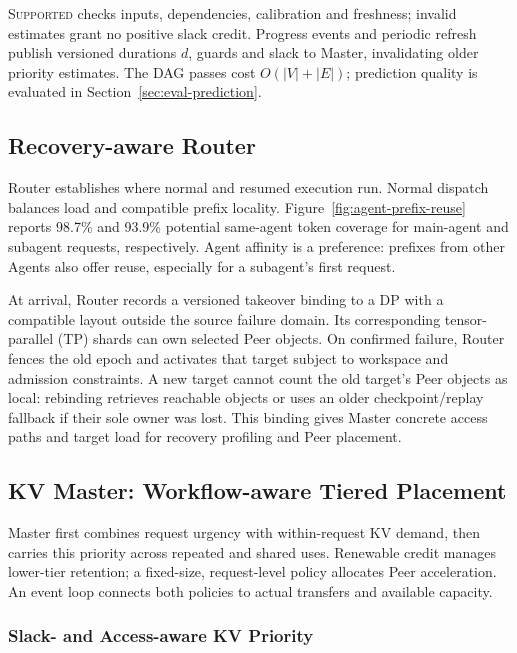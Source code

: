 \textsc{Supported} checks inputs, dependencies, calibration and freshness;
invalid estimates grant no positive slack credit. Progress events and
periodic refresh publish versioned durations $d$, guards and slack to
Master, invalidating older priority estimates. The DAG passes cost
$O(|V|+|E|)$; prediction quality is evaluated in
Section~\ref{sec:eval-prediction}.

\subsection{Recovery-aware Router}
\label{sec:recovery-router}

Router establishes where normal and resumed execution run. Normal
dispatch balances load and compatible prefix locality.
Figure~\ref{fig:agent-prefix-reuse} reports 98.7\% and 93.9\% potential
same-agent token coverage for main-agent and subagent requests,
respectively. Agent affinity is a preference: prefixes from other Agents
also offer reuse, especially for a subagent's first request.

At arrival, Router records a versioned takeover binding to a DP with a
compatible layout outside the source failure domain. Its corresponding
tensor-parallel (TP) shards can own selected Peer objects. On confirmed
failure, Router fences the old epoch and activates that target subject
to workspace and admission constraints. A new target cannot count the
old target's Peer objects as local: rebinding retrieves reachable objects
or uses an older checkpoint/replay fallback if their sole owner was lost.
This binding gives Master concrete access paths and target load for
recovery profiling and Peer placement.

\subsection{KV Master: Workflow-aware Tiered Placement}
\label{sec:kv-master}

Master first combines request urgency with within-request KV demand,
then carries this priority across repeated and shared uses. Renewable
credit manages lower-tier retention; a fixed-size, request-level policy
allocates Peer acceleration. An event loop connects both policies to
actual transfers and available capacity.

\subsubsection{Slack- and Access-aware KV Priority}
\label{sec:placement-value}
\label{sec:prefix-value}

